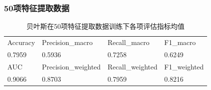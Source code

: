 \documentclass[10pt]{article}
\begin{document}
\subsubsection*{50项特征提取数据}
\begin{table}[H]
  \centering
  \caption{贝叶斯在50项特征提取数据训练下各项评估指标均值}
  \begin{tabular}{llll}
  \toprule
  Accuracy & Precision\_macro & Recall\_macro & F1\_macro \\
  0.7959 & 0.5936 & 0.7258 & 0.6249 \\
  \midrule
  AUC & Precision\_weighted & Recall\_weighted & F1\_weighted \\
  0.9066 & 0.8703 & 0.7959 & 0.8216 \\
  \bottomrule
  \end{tabular}
\end{table}
\end{document}
